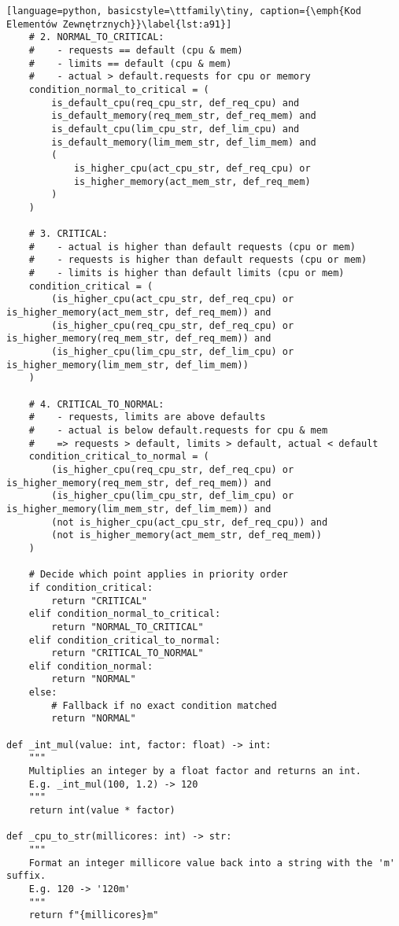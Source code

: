 \begin{lstlisting}[language=python, basicstyle=\ttfamily\tiny, caption={\emph{Kod Elementów Zewnętrznych}}\label{lst:a91}]
    # 2. NORMAL_TO_CRITICAL:
    #    - requests == default (cpu & mem)
    #    - limits == default (cpu & mem)
    #    - actual > default.requests for cpu or memory
    condition_normal_to_critical = (
        is_default_cpu(req_cpu_str, def_req_cpu) and
        is_default_memory(req_mem_str, def_req_mem) and
        is_default_cpu(lim_cpu_str, def_lim_cpu) and
        is_default_memory(lim_mem_str, def_lim_mem) and
        (
            is_higher_cpu(act_cpu_str, def_req_cpu) or
            is_higher_memory(act_mem_str, def_req_mem)
        )
    )

    # 3. CRITICAL:
    #    - actual is higher than default requests (cpu or mem)
    #    - requests is higher than default requests (cpu or mem)
    #    - limits is higher than default limits (cpu or mem)
    condition_critical = (
        (is_higher_cpu(act_cpu_str, def_req_cpu) or is_higher_memory(act_mem_str, def_req_mem)) and
        (is_higher_cpu(req_cpu_str, def_req_cpu) or is_higher_memory(req_mem_str, def_req_mem)) and
        (is_higher_cpu(lim_cpu_str, def_lim_cpu) or is_higher_memory(lim_mem_str, def_lim_mem))
    )

    # 4. CRITICAL_TO_NORMAL:
    #    - requests, limits are above defaults
    #    - actual is below default.requests for cpu & mem
    #    => requests > default, limits > default, actual < default
    condition_critical_to_normal = (
        (is_higher_cpu(req_cpu_str, def_req_cpu) or is_higher_memory(req_mem_str, def_req_mem)) and
        (is_higher_cpu(lim_cpu_str, def_lim_cpu) or is_higher_memory(lim_mem_str, def_lim_mem)) and
        (not is_higher_cpu(act_cpu_str, def_req_cpu)) and
        (not is_higher_memory(act_mem_str, def_req_mem))
    )

    # Decide which point applies in priority order
    if condition_critical:
        return "CRITICAL"
    elif condition_normal_to_critical:
        return "NORMAL_TO_CRITICAL"
    elif condition_critical_to_normal:
        return "CRITICAL_TO_NORMAL"
    elif condition_normal:
        return "NORMAL"
    else:
        # Fallback if no exact condition matched
        return "NORMAL"

def _int_mul(value: int, factor: float) -> int:
    """
    Multiplies an integer by a float factor and returns an int.
    E.g. _int_mul(100, 1.2) -> 120
    """
    return int(value * factor)

def _cpu_to_str(millicores: int) -> str:
    """
    Format an integer millicore value back into a string with the 'm' suffix.
    E.g. 120 -> '120m'
    """
    return f"{millicores}m"


\end{lstlisting}
